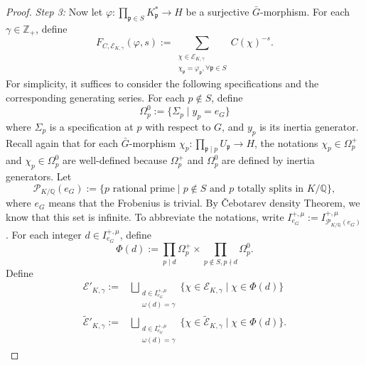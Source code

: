 \documentclass{amsart}
\numberwithin{equation}{section}
\theoremstyle{plain}
\theoremstyle{definition}
\theoremstyle{remark}
\begin{document}
\begin{proof}
	\emph{Step 3:}
	Now let $\varphi:\prod_{\mathfrak{p}\in S}K_{\mathfrak{p}}^*\to H$ be a surjective $\bar{G}$-morphism.
	For each $\gamma\in\mathbb{Z}_+$, define
	\begin{equation*}
		F_{C,\mathcal{E}_{K,\gamma}}(\varphi,s):=
		\sum_{
			\substack{
				\chi\in\mathcal{E}_{K,\gamma}\\
				\chi_{\mathfrak{p}}=\varphi_{\mathfrak{p}},\forall\mathfrak{p}\in S
			}
		}C(\chi)^{-s}.
	\end{equation*}
	For simplicity, it suffices to consider the following specifications and the corresponding generating series.
	For each $p\notin S$, define
	\begin{equation*}
		\Omega_p^0:=\{\Sigma_p\mid y_p=e_G\}
	\end{equation*}
	where $\Sigma_p$ is a specification at $p$ with respect to $G$, and $y_p$ is its inertia generator.
	Recall again that for each $\bar{G}$-morphism $\chi_p:\prod_{\mathfrak{p}\mid p}U_{\mathfrak{p}}\to H$, the notations $\chi_p\in\Omega_p^+$ and $\chi_p\in\Omega_p^0$ are well-defined because $\Omega^+_p$ and $\Omega_p^0$ are defined by inertia generators.
	Let
	\begin{equation*}
		\mathcal{P}_{K/\mathbb{Q}}(e_G):=\{p\text{ rational prime}\mid p\notin S\text{ and }p\text{ totally splits in }K/\mathbb{Q}\},
	\end{equation*}
    where $e_G$ means that the Frobenius is trivial.
	By \v{C}ebotarev density Theorem, we know that this set is infinite.
    To abbreviate the notations, write $I^{+,\mu}_{e_G}:=I^{+,\mu}_{\mathcal{P}_{K/\mathbb{Q}}(e_G)}$.
	For each integer $d\in I^{+,\mu}_{e_G}$, define
	\begin{equation*}
		\Phi(d):=\prod_{p\mid d}\Omega_p^+\times\prod_{p\notin S,p\nmid d}\Omega_p^0.
	\end{equation*}
	Define
	\begin{equation*}
		\begin{aligned}
			\mathcal{E}'_{K,\gamma}:=
			&\bigsqcup_{
				\substack{
					d\in I^{+,\mu}_{e_G}\\
					\omega(d)=\gamma
				}
			}
			\{\chi\in\mathcal{E}_{K,\gamma}\mid\chi\in\Phi(d)\}
			\\
			\tilde{\mathcal{E}}'_{K,\gamma}:=
			&\bigsqcup_{
				\substack{
					d\in I^{+,\mu}_{e_G}\\
					\omega(d)=\gamma
				}
			}\{\chi\in\tilde{\mathcal{E}}_{K,\gamma}\mid\chi\in\Phi(d)\}.
		\end{aligned}		
	\end{equation*}

\end{proof}
\end{document}
